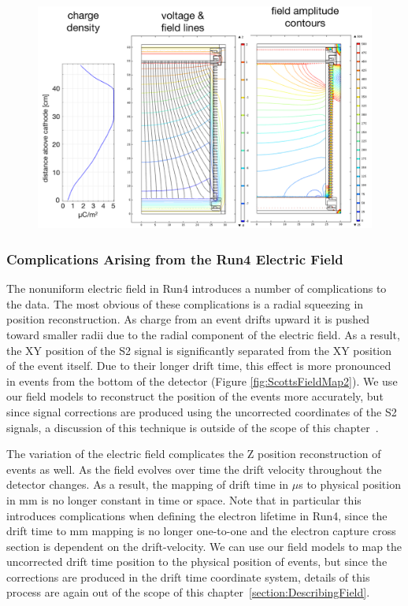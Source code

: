 \begin{figure} [!htb]
\includegraphics[scale=0.4]{Run04Corrections/Sep2014_Field_Detailed.png}
\label{fig:ScottsFieldMap}
\end{figure}

\subsubsection{Complications Arising from the Run4 Electric Field} \label{section:NEST}

The nonuniform electric field in Run4 introduces a number of complications to the data.  The most obvious of these complications is a radial squeezing in position reconstruction.  As charge from an event drifts upward it is pushed toward smaller radii due to the radial component of the electric field.  As a result, the XY position of the S2 signal is significantly separated from the XY position of the event itself.  Due to their longer drift time, this effect is more pronounced in events from the bottom of the detector (Figure \ref{fig:ScottsFieldMap2}). We use our field models to reconstruct the position of the events more accurately, but since signal corrections are produced using the uncorrected coordinates of the S2 signals, a discussion of this technique is outside of the scope of this chapter~\cite{PositionRecon}.

The variation of the electric field complicates the Z position reconstruction of events as well.  As the field evolves over time the drift velocity throughout the detector changes.  As a result, the mapping of drift time in $\mu$s to physical position in mm is no longer constant in time or space. Note that in particular this introduces complications when defining the electron lifetime in Run4, since the drift time to mm mapping is no longer one-to-one and the electron capture cross section is dependent on the drift-velocity.  We can use our field models to map the uncorrected drift time position to the physical position of events, but since the corrections are produced in the drift time coordinate system, details of this process are again out of the scope of this chapter~\ref{section:DescribingField}.  

